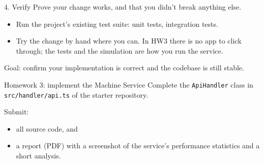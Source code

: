 \documentclass[aspectratio=169]{beamer}
\begin{document}
\begin{frame}{4. Verify}
  Prove your change works, and that you didn't break anything else.
  \begin{itemize}
    \item Run the project's existing test suite: unit tests, integration tests.
    \item Try the change by hand where you can. In HW3 there is no app to click through; the
      tests and the simulation are how you run the service.
  \end{itemize}
  \alert{Goal:} confirm your implementation is correct and the codebase is still stable.
\end{frame}

\begin{frame}{Homework 3: implement the Machine Service}
  Complete the \texttt{ApiHandler} class in \texttt{src/handler/api.ts} of the starter
  repository.

  \medskip
  Submit:
  \begin{itemize}
    \item all source code, and
    \item a report (PDF) with a screenshot of the service's performance statistics and a
      short analysis.
  \end{itemize}
\end{frame}
\end{document}
